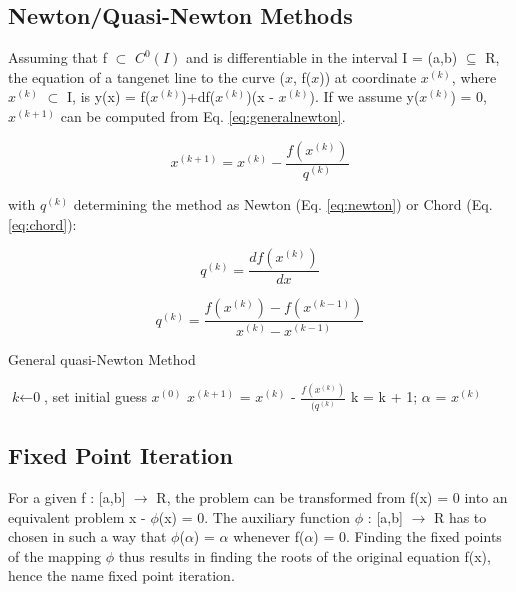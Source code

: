 \documentclass[11pt, a4paper]{article}
\begin{document}
\subsection{Newton/Quasi-Newton Methods}
Assuming that f $\subset$ $C^{0}(I)$ and is differentiable in the interval I = (a,b) $\subseteq$ R, the equation of a tangenet line to the curve ($x$, f($x$)) at coordinate $x^{(k)}$, where $x^{(k)}$ $\subset$ I, is y(x) = f($x^{(k)}$)+df($x^{(k)}$)(x - $x^{(k)}$).  If we assume y($x^{(k)}$) = 0, $x^{(k+1)}$ can be computed from Eq. \ref{eq:generalnewton}.

\begin{equation} \label{eq:generalnewton}
  x^{(k+1)} = x^{(k)} - \frac{f(x^{(k)})}{q^{(k)}}
\end{equation}

with $q^{(k)}$ determining the method as Newton (Eq. \ref{eq:newton}) or Chord (Eq. \ref{eq:chord}):

\begin{equation} \label{eq:newton}
  q^{(k)} = \frac{df(x^{(k)})}{dx}
\end{equation}

\begin{equation} \label{eq:chord}
  q^{(k)} = \frac{f(x^{(k)})-f(x^{(k-1)})}{x^{(k)}-x^{(k-1)}}
\end{equation}

\begin{algorithm}
  \caption{General quasi-Newton Method}\label{quasinewton}
  \begin{algorithmic}[1]
    \State  $\textit{k} \gets \text{0}$, set initial guess $x^{(0)}$  
    \State $x^{(k+1)}$ = $x^{(k)}$ - $\frac{f(x^{(k)})}{(q^{(k)}}$
    \State k = k + 1;
    \EndWhile
    \Return $\alpha$ = $x^{(k)}$
  \end{algorithmic}
\end{algorithm}

\subsection{Fixed Point Iteration}
For a given f : [a,b] $\rightarrow$ R, the problem can be transformed from f(x) = 0 into an equivalent problem x - $\phi$(x) = 0.  The auxiliary function $\phi$ : [a,b] $\rightarrow$ R has to chosen in such a way that $\phi$($\alpha$) = $\alpha$ whenever f($\alpha$) = 0. Finding the fixed points of the mapping $\phi$ thus results in finding the roots of the original equation f(x), hence the name fixed point iteration.
\end{document}
